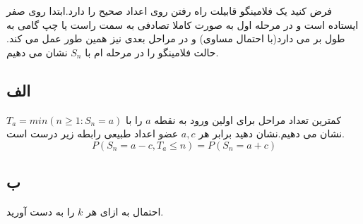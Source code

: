 
فرض کنید یک فلامینگو قابیلت راه رفتن روی اعداد صحیح را دارد.ابتدا روی صفر ایستاده است و در مرحله اول به صورت کاملا تصادفی به سمت راست یا چپ گامی به طول  بر می دارد(با احتمال مساوی) و در مراحل بعدی نیز همین طور عمل می کند. حالت فلامینگو را در مرحله  ام با $S_{n}$ نشان می دهیم.

\subsection*{الف}
کمترین تعداد مراحل برای اولین ورود به نقطه $a$ را با $T_{a} = min(n \geq 1 : S_{n} = a)$ نشان می دهیم.نشان دهید برابر هر $a , c$ عضو اعداد طبیعی رابطه زیر درست است.
$$P(S_{n} = a - c , T_{a} \leq n) = P(S_{n} = a + c)$$
\subsection*{ب}
احتمال  به ازای هر $k$ را به دست آورید.

